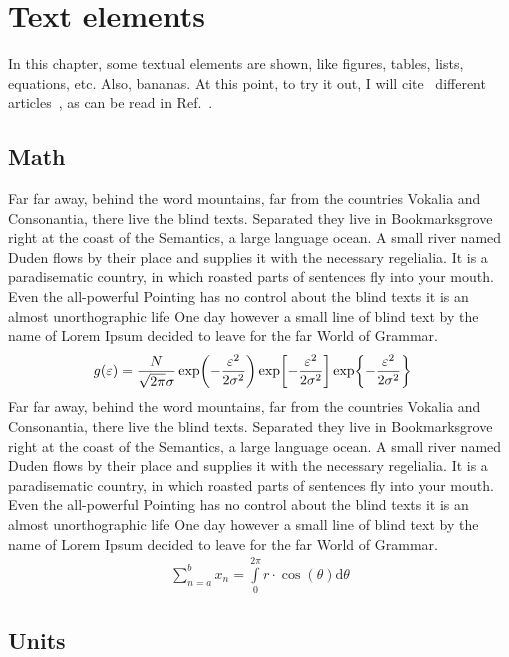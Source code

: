 \chapter{Text elements}
\label{cha:text-elements}

In this chapter, some textual elements are shown, like figures, tables,
lists, equations, etc. Also, bananas. At this point, to try it out, I will
cite~\cite{a} different articles~\cite{a,b,c}, as can be read in Ref.~\cite{b}.

\section{Math}
\label{sec:math}

Far far away, behind the word mountains, far from the countries Vokalia and
Consonantia, there live the blind texts. Separated they live in
Bookmarksgrove right at the coast of the Semantics, a large language
ocean. A small river named Duden flows by their place and supplies it with
the necessary regelialia. It is a paradisematic country, in which roasted
parts of sentences fly into your mouth. Even the all-powerful Pointing has
no control about the blind texts it is an almost unorthographic life One
day however a small line of blind text by the name of Lorem Ipsum decided
to leave for the far World of Grammar.
\begin{align}
    g(\varepsilon) &= \frac{N}{\sqrt{2\pi} \sigma}
    \exp\!\left(-\frac{\varepsilon^2}{2\sigma^2}\right)
    \exp\!\left[-\frac{\varepsilon^2}{2\sigma^2}\right]
    \exp\!\left\{-\frac{\varepsilon^2}{2\sigma^2}\right\} 
    \label{eq:eq1}
\end{align}
Far far away, behind the word mountains, far from the countries Vokalia and
Consonantia, there live the blind texts. Separated they live in
Bookmarksgrove right at the coast of the Semantics, a large language
ocean. A small river named Duden flows by their place and supplies it with
the necessary regelialia. It is a paradisematic country, in which roasted
parts of sentences fly into your mouth. Even the all-powerful Pointing has
no control about the blind texts it is an almost unorthographic life One
day however a small line of blind text by the name of Lorem Ipsum decided
to leave for the far World of Grammar.
\begin{align}
  \sum\limits^b_{n=a}x_n = \int\limits^{2\pi}_0 r\cdot \cos(\theta) \mathrm d \theta
\end{align}


\section{Units}
\label{sec:units}

